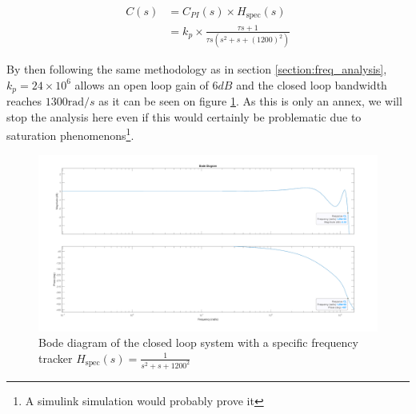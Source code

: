 \begin{align}
    C(s) &= C_{PI}(s) \times H_{\text{spec}}(s)\\
    &= k_p\times\frac{\tau s + 1}{\tau s(s^2+s+(1200)^2)}
\end{align}

By then following the same methodology as in section \ref{section:freq_analysis}, $k_p = 24\times 10^6$ allows an open 
loop gain of $6 dB$ and the closed loop bandwidth reaches $1300 \text{rad}/s$ as it can be seen on figure 
\ref{fig:spec_ref_tracker}. As this is only an annex, we will stop the analysis here even if this would certainly be 
problematic due to saturation phenomenons\footnote{A simulink simulation would probably prove it}. 

\begin{figure}[H]
    \centering
    \includegraphics[height=\textheight/3]{Pictures/annex_spec_cmplx.png}
    \caption{Bode diagram of the closed loop system with a specific frequency tracker $H_{\text{spec}}(s) = \frac{1}{s^2
    +s+1200^2}$}
    \label{fig:spec_ref_tracker}
\end{figure}


